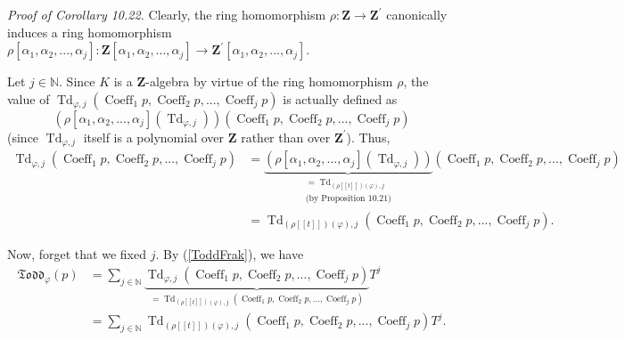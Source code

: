 \documentclass[numbers=enddot,12pt,final,onecolumn,notitlepage]{scrartcl}%
\begin{document}
\textit{Proof of Corollary 10.22.} Clearly, the ring homomorphism
$\rho:\mathbf{Z}\rightarrow\mathbf{Z}^{\prime}$ canonically induces a ring
homomorphism $\rho\left[  \alpha_{1},\alpha_{2},...,\alpha_{j}\right]
:\mathbf{Z}\left[  \alpha_{1},\alpha_{2},...,\alpha_{j}\right]  \rightarrow
\mathbf{Z}^{\prime}\left[  \alpha_{1},\alpha_{2},...,\alpha_{j}\right]  $.

Let $j\in\mathbb{N}$. Since $K$ is a $\mathbf{Z}$-algebra by virtue of the
ring homomorphism $\rho$, the value of $\operatorname*{Td}\nolimits_{\varphi
,j}\left(  \operatorname*{Coeff}\nolimits_{1}p,\operatorname*{Coeff}%
\nolimits_{2}p,...,\operatorname*{Coeff}\nolimits_{j}p\right)  $ is actually
defined as%
\[
\left(  \rho\left[  \alpha_{1},\alpha_{2},...,\alpha_{j}\right]  \left(
\operatorname*{Td}\nolimits_{\varphi,j}\right)  \right)  \left(
\operatorname*{Coeff}\nolimits_{1}p,\operatorname*{Coeff}\nolimits_{2}%
p,...,\operatorname*{Coeff}\nolimits_{j}p\right)
\]
(since $\operatorname*{Td}\nolimits_{\varphi,j}$ itself is a polynomial over
$\mathbf{Z}$ rather than over $\mathbf{Z}^{\prime}$). Thus,%
\begin{align*}
\operatorname*{Td}\nolimits_{\varphi,j}\left(  \operatorname*{Coeff}%
\nolimits_{1}p,\operatorname*{Coeff}\nolimits_{2}p,...,\operatorname*{Coeff}%
\nolimits_{j}p\right)   &  =\underbrace{\left(  \rho\left[  \alpha_{1}%
,\alpha_{2},...,\alpha_{j}\right]  \left(  \operatorname*{Td}%
\nolimits_{\varphi,j}\right)  \right)  }_{\substack{=\operatorname*{Td}%
\nolimits_{\left(  \rho\left[  \left[  t\right]  \right]  \right)  \left(
\varphi\right)  ,j}\\\text{(by Proposition 10.21)}}}\left(
\operatorname*{Coeff}\nolimits_{1}p,\operatorname*{Coeff}\nolimits_{2}%
p,...,\operatorname*{Coeff}\nolimits_{j}p\right) \\
&  =\operatorname*{Td}\nolimits_{\left(  \rho\left[  \left[  t\right]
\right]  \right)  \left(  \varphi\right)  ,j}\left(  \operatorname*{Coeff}%
\nolimits_{1}p,\operatorname*{Coeff}\nolimits_{2}p,...,\operatorname*{Coeff}%
\nolimits_{j}p\right)  .
\end{align*}


Now, forget that we fixed $j$. By (\ref{ToddFrak}), we have%
\begin{align*}
\mathfrak{Todd}_{\varphi}\left(  p\right)   &  =\sum\limits_{j\in\mathbb{N}%
}\underbrace{\operatorname*{Td}\nolimits_{\varphi,j}\left(
\operatorname*{Coeff}\nolimits_{1}p,\operatorname*{Coeff}\nolimits_{2}%
p,...,\operatorname*{Coeff}\nolimits_{j}p\right)  }_{=\operatorname*{Td}%
\nolimits_{\left(  \rho\left[  \left[  t\right]  \right]  \right)  \left(
\varphi\right)  ,j}\left(  \operatorname*{Coeff}\nolimits_{1}%
p,\operatorname*{Coeff}\nolimits_{2}p,...,\operatorname*{Coeff}\nolimits_{j}%
p\right)  }T^{j}\\
&  =\sum\limits_{j\in\mathbb{N}}\operatorname*{Td}\nolimits_{\left(
\rho\left[  \left[  t\right]  \right]  \right)  \left(  \varphi\right)
,j}\left(  \operatorname*{Coeff}\nolimits_{1}p,\operatorname*{Coeff}%
\nolimits_{2}p,...,\operatorname*{Coeff}\nolimits_{j}p\right)  T^{j}.
\end{align*}
\end{document}
